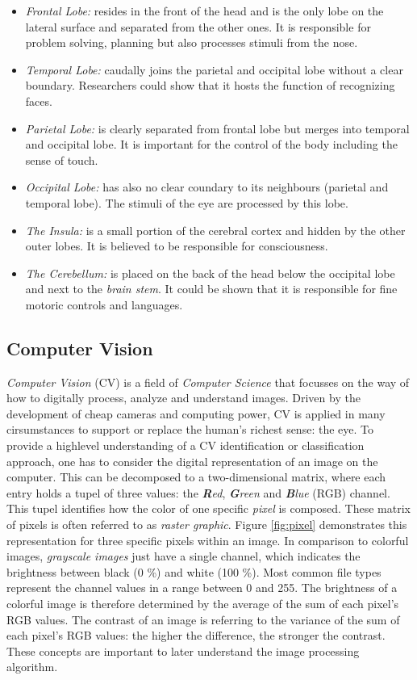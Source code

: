 \documentclass[twoside,11pt]{article}
\begin{document}
\begin{itemize}
	\item \textit{Frontal Lobe:} resides in the front of the head and is the only lobe on the lateral surface and separated from the other ones. It is responsible for problem solving, planning but also processes stimuli from the nose. 
	\item \textit{Temporal Lobe:} caudally joins the parietal and occipital lobe without a clear boundary. Researchers could show that it hosts the function of recognizing faces.
	\item \textit{Parietal Lobe:} is clearly separated from frontal lobe but merges into temporal and occipital lobe. It is important for the control of the body including the sense of touch.
	\item \textit{Occipital Lobe:} has also no clear coundary to its neighbours (parietal and temporal lobe). The stimuli of the eye are  processed by this lobe.
	\item \textit{The Insula:} is a small portion of the cerebral cortex and hidden by the other outer lobes. It is believed to be responsible for  consciousness.
	\item \textit{The Cerebellum:} is placed on the back of the head below the occipital lobe and next to the \textit{brain stem}. It could be shown that it is responsible for fine motoric controls and languages.
\end{itemize}
\citep{duvernoy2012human}

\subsection{Computer Vision}
\label{cv}
\textit{Computer Vision} (CV) is a field of \textit{Computer Science} that focusses on the way of how to digitally process, analyze and understand images. Driven by the development of cheap cameras and computing power, CV is applied in many cirsumstances to support or replace the human's richest sense: the eye.
To provide a highlevel understanding of a CV identification or classification approach, one has to consider the digital representation of an image on the computer. This can be decomposed to a two-dimensional matrix, where each entry holds a tupel of three values: the \textit{\textbf{R}ed}, \textit{\textbf{G}reen} and \textit{\textbf{B}lue} (RGB) channel. This tupel identifies how the color of one specific \textit{pixel} is composed. These matrix of pixels is often referred to as \textit{raster graphic}. Figure \ref{fig:pixel} demonstrates this representation for three specific pixels within an image. In comparison to colorful images, \textit{grayscale images} just have a single channel, which indicates the brightness between black (0 \%) and white (100 \%). Most common file types represent the  channel values  in a range between 0 and 255. The brightness of a colorful image is therefore determined by the average of the sum of each pixel's RGB values. The contrast of an image is referring to the variance of the sum of each pixel's RGB values: the higher the difference, the stronger the contrast. These concepts are important to later understand the image processing algorithm.
\end{document}
